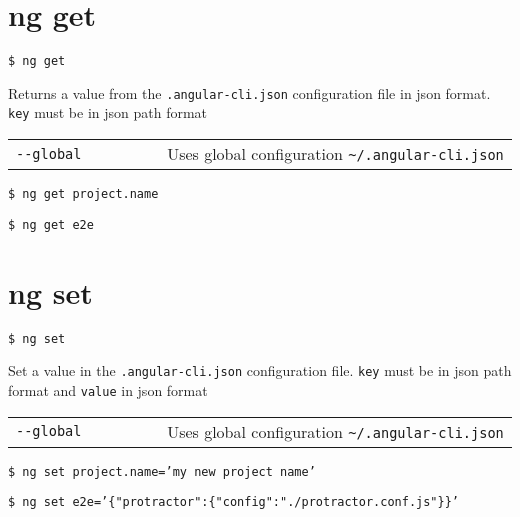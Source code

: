\documentclass[8pt]{extarticle} %
\begin{document}
\begin{multicols}{3}
\section*{ng get}

  \vspace{1ex}
  {\tt \$ ng get }

  \vspace{0.6ex}

  {\small Returns a value from the {\tt .angular-cli.json} configuration file in json format. {\tt key} must be in json path format}

  \vspace{0.6ex}

  \begin{tabular}{L{0.30\linewidth} L{0.70\linewidth}}
    \tt -{}-global  & \small Uses global configuration {\tt \textasciitilde/.angular-cli.json}
  \end{tabular}

  \vspace{0.6ex}

  {\tt \$ ng get project.name}

  {\tt \$ ng get e2e}

\section*{ng set}

  \vspace{1ex}
  {\tt \$ ng set }

  \vspace{0.6ex}

  {\small Set a value in the {\tt .angular-cli.json} configuration file. {\tt key} must be in json path format and {\tt value} in json format}

  \vspace{0.6ex}

  \begin{tabular}{L{0.30\linewidth} L{0.70\linewidth}}
    \tt -{}-global  & \small Uses global configuration {\tt \textasciitilde/.angular-cli.json}
  \end{tabular}

  \vspace{0.6ex}

  {\tt \$ ng set project.name='my new project name'}

  {\small {\tt \$ ng set e2e='\{"protractor":\{"config":"./protractor.conf.js"\}\}'}}


\end{multicols}
\end{document}
